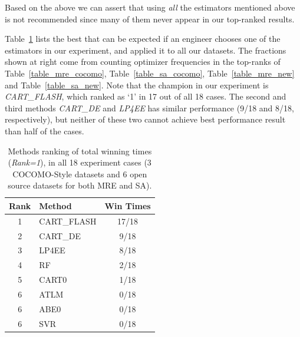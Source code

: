 \documentclass[sigconf,review,anonymous]{acmart}
\begin{document}
 Based on the above we can assert that
 using  {\em all} the estimators mentioned above is not recommended since many of them never appear in our top-ranked results.










Table~\ref{tbl:methodsrk} lists the best that can be expected if an engineer  chooses one of the
estimators in our experiment, and applied it to all our datasets.
The fractions shown at right come from counting optimizer frequencies in the top-ranks of  Table~\ref{table_mre_cocomo}, Table~\ref{table_sa_cocomo}, Table~\ref{table_mre_new}
and Table~\ref{table_sa_new}. Note that
the champion in our experiment is {\it CART\_FLASH}, which ranked as `1' in 17 out of all 18 cases. The second and third methods {\it CART\_DE} and {\it LP4EE} has similar performance (9/18 and 8/18, respectively), but neither of these two cannot achieve best performance result than half of the cases.


\begin{table}
\small
 \caption{Methods ranking of total winning times ({\em Rank=1}), in all 18 experiment cases (3 COCOMO-Style datasets and 6 open source datasets for both MRE and SA).}\label{tbl:methodsrk}
\centering
{  
\begin{tabular}{clc} \\
  {\textbf{Rank}}& \textbf{Method} & \textbf{Win Times}\\
  \hline
    1 &      CART\_FLASH    &    17/18\\\hline 
    2 &      CART\_DE       &    9/18\\\hline 
    3 &      LP4EE          &    8/18\\\hline 
    4 &      RF             &    2/18\\\hline 
    5 &      CART0          &    1/18\\\hline 
    6 &      ATLM           &    0/18\\
    6 &      ABE0           &    0/18\\
    6 &      SVR            &    0/18\\
    \hline   
\end{tabular}}
\end{table}
\end{document}
